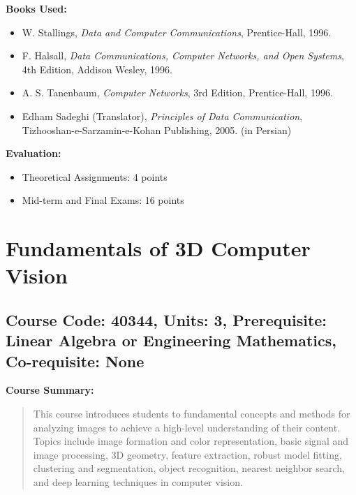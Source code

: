 \documentclass[12pt]{article}
\begin{document}
\textbf{Books Used:}
\begin{itemize}
    \item W. Stallings, \textit{Data and Computer Communications}, Prentice-Hall, 1996.
    \item F. Halsall, \textit{Data Communications, Computer Networks, and Open Systems}, 4th Edition, Addison Wesley, 1996.
    \item A. S. Tanenbaum, \textit{Computer Networks}, 3rd Edition, Prentice-Hall, 1996.
    \item Edham Sadeghi (Translator), \textit{Principles of Data Communication}, Tizhooshan-e-Sarzamin-e-Kohan Publishing, 2005. (in Persian)
\end{itemize}

\textbf{Evaluation:}
\begin{itemize}
    \item Theoretical Assignments: 4 points
    \item Mid-term and Final Exams: 16 points
\end{itemize}

\newpage

\section{Fundamentals of 3D Computer Vision}
\subsection*{Course Code: 40344, Units: 3, Prerequisite: Linear Algebra or Engineering Mathematics, Co-requisite: None}

\textbf{Course Summary:} 
\begin{quote}
   This course introduces students to fundamental concepts and methods for analyzing images to achieve a high-level understanding of their content. Topics include image formation and color representation, basic signal and image processing, 3D geometry, feature extraction, robust model fitting, clustering and segmentation, object recognition, nearest neighbor search, and deep learning techniques in computer vision.
\end{quote}
\end{document}
